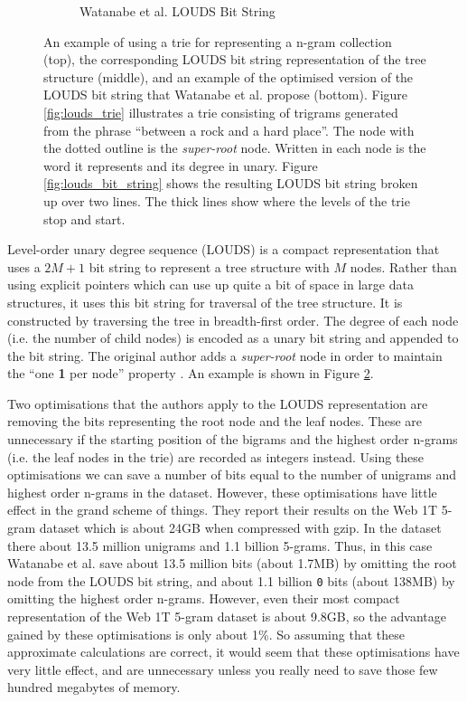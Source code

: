 \documentclass[sigconf, nonacm=true]{acmart}
\begin{document}
\begin{figure}
\begin{subfigure}{\linewidth}
         \caption{Watanabe et al. LOUDS Bit String}
         \label{fig:watanabe_louds_bit_string}
     \end{subfigure}

    \caption{An example of using a trie for representing a n-gram collection (top), the corresponding LOUDS bit string representation of the tree structure (middle), and an example of the optimised version of the LOUDS bit string that Watanabe et al. propose (bottom). Figure \ref{fig:louds_trie} illustrates a trie consisting of trigrams generated from the phrase ``between a rock and a hard place''. The node with the dotted outline is the \textit{super-root} node. Written in each node is the word it represents and its degree in unary.
    Figure \ref{fig:louds_bit_string} shows the resulting LOUDS bit string broken up over two lines. The thick lines show where the levels of the trie stop and start.
    }
    \label{fig:louds_example}
\end{figure}

Level-order unary degree sequence (LOUDS) is a compact representation that uses a $2M + 1$ bit string to represent a tree structure with $M$ nodes. Rather than using explicit pointers which can use up quite a bit of space in large data structures, it uses this bit string for traversal of the tree structure. It is constructed by traversing the tree in breadth-first order. The degree of each node (i.e. the number of child nodes) is encoded as a unary bit string and appended to the bit string. The original author adds a \textit{super-root} node in order to maintain the ``one \textbf{1} per node'' property \cite{jacobson1989space}. An example is shown in Figure \ref{fig:louds_example}.

Two optimisations that the authors apply to the LOUDS representation are removing the bits representing the root node and the leaf nodes. These are unnecessary if the starting position of the bigrams and the highest order n-grams (i.e. the leaf nodes in the trie) are recorded as integers instead. Using these optimisations we can save a number of bits equal to the number of unigrams and highest order n-grams in the dataset. However, these optimisations have little effect in the grand scheme of things. They report their results on the Web 1T 5-gram dataset which is about 24GB when compressed with gzip. In the dataset there about 13.5 million unigrams and 1.1 billion 5-grams. Thus, in this case Watanabe et al. save about 13.5 million bits (about 1.7MB) by omitting the root node from the LOUDS bit string, and about 1.1 billion \texttt{0} bits (about 138MB) by omitting the highest order n-grams. However, even their most compact representation of the Web 1T 5-gram dataset is about 9.8GB, so the advantage gained by these optimisations is only about 1\%. So assuming that these approximate calculations are correct, it would seem that these optimisations have very little effect, and are unnecessary unless you really need to save those few hundred megabytes of memory.
\end{document}
